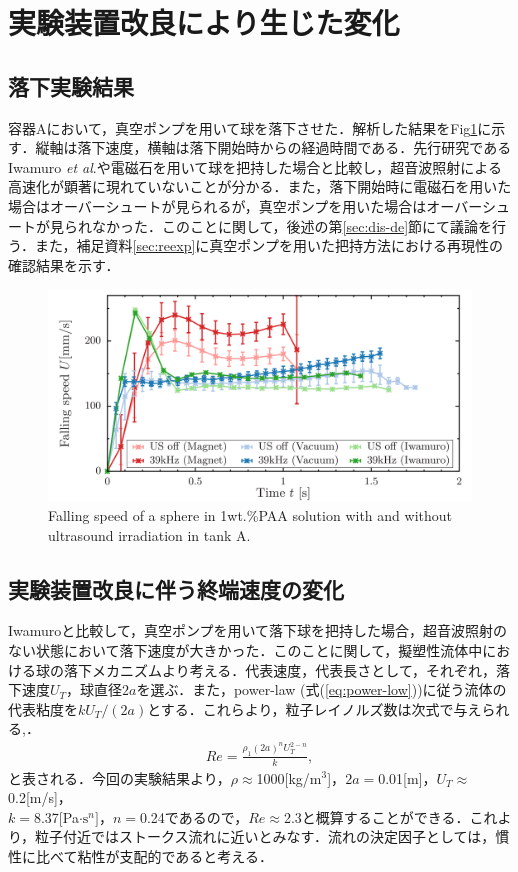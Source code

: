 \section{実験装置改良により生じた変化}

\subsection{落下実験結果}

容器Aにおいて，真空ポンプを用いて球を落下させた．解析した結果をFig\ref{fig:falling-A}に示す．縦軸は落下速度，横軸は落下開始時からの経過時間である．先行研究であるIwamuro \textit{et al}.\cite{ref:8}や電磁石を用いて球を把持した場合と比較し，超音波照射による高速化が顕著に現れていないことが分かる．また，落下開始時に電磁石を用いた場合はオーバーシュートが見られるが，真空ポンプを用いた場合はオーバーシュートが見られなかった．このことに関して，後述の第\ref{sec:dis-de}節にて議論を行う．また，補足資料\ref{sec:reexp}に真空ポンプを用いた把持方法における再現性の確認結果を示す．

\begin{figure}[ht]
    \centering
    \includegraphics[width=12cm,clip]{./4-Results/s1-A.png}
    \caption{Falling speed of a sphere in 1wt.\%PAA solution with and without ultrasound irradiation in tank A.}
    \label{fig:falling-A}
\end{figure}

\subsection{実験装置改良に伴う終端速度の変化}

Iwamuro\cite{ref:8}と比較して，真空ポンプを用いて落下球を把持した場合，超音波照射のない状態において落下速度が大きかった．このことに関して，擬塑性流体中における球の落下メカニズムより考える．代表速度，代表長さとして，それぞれ，落下速度$U_T$，球直径$2a$を選ぶ．また，power-law (式(\ref{eq:power-low}))に従う流体の代表粘度を$k U_T/(2a)$とする．これらより，粒子レイノルズ数は次式で与えられる\cite{ref:1},\cite{ref:8-5}．
\begin{eqnarray}
    Re = \frac{\rho_1 \left(2a\right)^n U_T^{2-n}}{k} ,
\end{eqnarray}
と表される\cite{ref:1,ref:8-5}．今回の実験結果より，$\rho \approx$1000[kg/m${}^3$]，$2a =$0.01[m]，$U_T \approx$0.2[m/s]，\\$k =$8.37[Pa$\cdot \text{s}^n]$，$n =$0.24であるので，$Re \approx$2.3と概算することができる．これより，粒子付近ではストークス流れに近いとみなす．流れの決定因子としては，慣性に比べて粘性が支配的であると考える．

